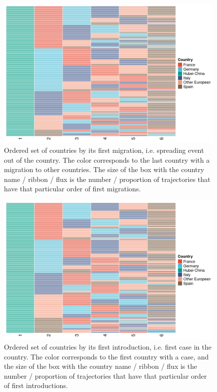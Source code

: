 \documentclass[12pt,]{article}
\begin{document}
\begin{figure}[]
    \centering
    \includegraphics[width=\textwidth]{201030_europe3_figtraj06.png}
    \caption{Ordered set of countries by its first migration, i.e. spreading event out of the country. The color corresponds to the last country with a migration to other countries. The size of the box with the country name / ribbon / flux is the number / proportion of trajectories that have that particular order of first migrations.}
    \label{fig:first_src}
\end{figure}


\begin{figure}[]
    \centering
    \includegraphics[width=\textwidth]{201030_europe3_figtraj05.png}
    \caption{Ordered set of countries by its first introduction, i.e. first case in the country. The color corresponds to the first country with a case, and the size of the box with the country name / ribbon / flux is the number / proportion of trajectories that have that particular order of first introductions.} 
    \label{fig:first_dest}
\end{figure}
\end{document}
